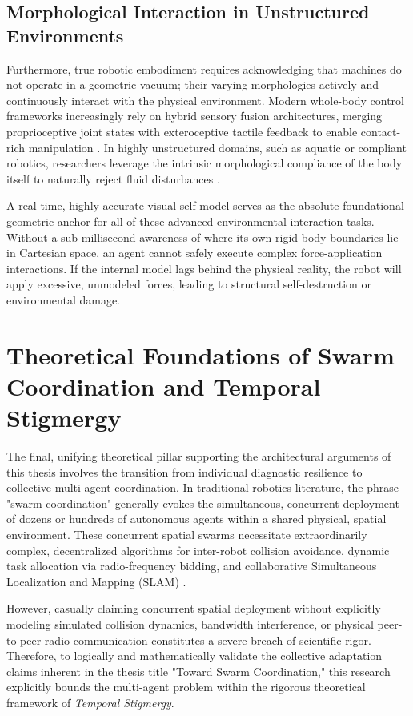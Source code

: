 \documentclass[12pt,a4paper,oneside]{report}
\begin{document}
\subsection{Morphological Interaction in Unstructured Environments}

Furthermore, true robotic embodiment requires acknowledging that machines do not operate in a geometric vacuum; their varying morphologies actively and continuously interact with the physical environment. Modern whole-body control frameworks increasingly rely on hybrid sensory fusion architectures, merging proprioceptive joint states with exteroceptive tactile feedback to enable contact-rich manipulation \cite{li2025m2resipolicy, lee2026tactiverse}. In highly unstructured domains, such as aquatic or compliant robotics, researchers leverage the intrinsic morphological compliance of the body itself to naturally reject fluid disturbances \cite{micklem2026aquatic, crotti2024softfoot}.

A real-time, highly accurate visual self-model serves as the absolute foundational geometric anchor for all of these advanced environmental interaction tasks. Without a sub-millisecond awareness of where its own rigid body boundaries lie in Cartesian space, an agent cannot safely execute complex force-application interactions. If the internal model lags behind the physical reality, the robot will apply excessive, unmodeled forces, leading to structural self-destruction or environmental damage.

\section{Theoretical Foundations of Swarm Coordination and Temporal Stigmergy}

The final, unifying theoretical pillar supporting the architectural arguments of this thesis involves the transition from individual diagnostic resilience to collective multi-agent coordination. In traditional robotics literature, the phrase "swarm coordination" generally evokes the simultaneous, concurrent deployment of dozens or hundreds of autonomous agents within a shared physical, spatial environment. These concurrent spatial swarms necessitate extraordinarily complex, decentralized algorithms for inter-robot collision avoidance, dynamic task allocation via radio-frequency bidding, and collaborative Simultaneous Localization and Mapping (SLAM) \cite{matsuki2024gaussian, keetha2024splattam, thirgood2025featureslam}.

However, casually claiming concurrent spatial deployment without explicitly modeling simulated collision dynamics, bandwidth interference, or physical peer-to-peer radio communication constitutes a severe breach of scientific rigor. Therefore, to logically and mathematically validate the collective adaptation claims inherent in the thesis title "Toward Swarm Coordination," this research explicitly bounds the multi-agent problem within the rigorous theoretical framework of \textit{Temporal Stigmergy}.
\end{document}
